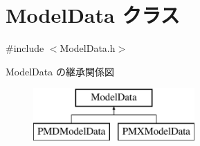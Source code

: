 \hypertarget{class_model_data}{}\section{Model\+Data クラス}
\label{class_model_data}


{\ttfamily \#include $<$Model\+Data.\+h$>$}

Model\+Data の継承関係図\begin{figure}[H]
\begin{center}
\leavevmode
\includegraphics[height=2.000000cm]{class_model_data}
\end{center}
\end{figure}
